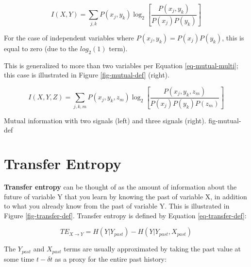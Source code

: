 \begin{equation}
I(X,Y) = \sum_{j,k} P(x_j,y_k) \log_2 \left [
\frac{P(x_j,y_k)}{P(x_j) P(y_k)} \right ]
\label{eq-mutual-def}
\end{equation}

For the case of independent variables where $P(x_j,y_k) = P(x_j) P(y_k)$,
this is equal to zero (due to the $log_2(1)$ term).

This is generalized to more than two variables per Equation
\ref{eq-mutual-multi}; this case is illustrated in Figure
\ref{fig-mutual-def} (right).

\begin{equation}
I(X,Y,Z) = \sum_{j,k,m} P(x_j,y_k,z_m) \log_2 \left [
\frac{P(x_j,y_k,z_m)}{P(x_j) P(y_k) P(z_m)} \right ]
\label{eq-mutual-multi}
\end{equation}

{Mutual information with two signals (left) and three signals (right).}
{fig-mutual-def}

\clearpage
%
\section{Transfer Entropy}
\label{sect-entropy-transfer}

\textbf{Transfer entropy} can be thought of as the amount of information
about the future of variable Y that you learn by knowing the past of
variable X, in addition to what you already know from the past of variable
Y. This is illustrated in Figure \ref{fig-transfer-def}. Transfer entropy
is defined by Equation \ref{eq-transfer-def}:

\begin{equation}
TE_{X \rightarrow Y} = H(Y|Y_{past}) - H(Y|Y_{past},X_{past})
\label{eq-transfer-def}
\end{equation}

The $Y_{past}$ and $X_{past}$ terms are usually approximated by taking the
past value at some time $t-\delta t$ as a proxy for the entire past history:

